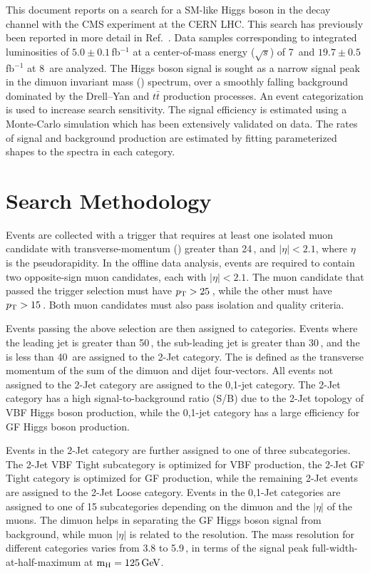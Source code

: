 \documentclass[10pt]{article}
\begin{document}
This document reports on a search for a SM-like Higgs boson in the \mm{} decay channel 
with the CMS experiment at the CERN LHC.  
This search has previously been reported in more detail in Ref.~\cite{CMS:2013aga}.
Data samples corresponding to integrated luminosities of 
$5.0\pm0.1$\,fb$^{-1}$ at a center-of-mass energy ($\sqrt{s}$) of
7\,\TeV{} and $19.7\pm0.5$\,fb$^{-1}$ at 8\,\TeV{} are analyzed.
The Higgs boson signal is sought as a narrow signal peak in the 
dimuon invariant mass (\Mmumu{}) spectrum, over a smoothly falling
background dominated by the Drell--Yan and $t\bar{t}$ production processes.  
An event categorization is used to increase search sensitivity.  
The signal efficiency is estimated using a Monte-Carlo
simulation which has been extensively validated on data.
The rates of signal and background production are estimated by fitting 
parameterized shapes to the \Mmumu{} spectra in each category.

\section{Search Methodology}

Events are collected with a trigger that requires at least one
isolated muon candidate with transverse-momentum (\pt) greater than 24\,\GeVc{},
and $|\eta|<2.1$, where $\eta$ is the pseudorapidity.  In the offline
data analysis, events are required to contain two opposite-sign
muon candidates, each with $|\eta|<2.1$.  The muon candidate that passed 
the trigger selection must have $p_{\mathrm{T}}{}>25$\,\GeVc{}, while the other must 
have $p_{\mathrm{T}}>15$\,\GeVc{}. Both muon candidates must also pass isolation and quality 
criteria.

Events passing the above selection are then assigned to categories.  Events
where the leading jet \pt{} is greater than 50\,\GeVc{}, the sub-leading
jet \pt{} is greater than 30\,\GeVc{}, and the \ptmiss{} is less than 40\,\GeVc{} 
are assigned to the 2-Jet category.  The \ptmiss{} is defined as the transverse
momentum of the sum of the dimuon and dijet four-vectors.
All events not assigned to the 2-Jet category are assigned to the 0,1-jet category.
The 2-Jet category has a high signal-to-background ratio (S/B) due to the 2-Jet
topology of VBF Higgs boson production, while the 0,1-jet category has a large
efficiency for GF Higgs boson production.

Events in the 2-Jet category are further assigned to one of three subcategories.  The 2-Jet
VBF Tight subcategory is optimized for VBF production, the 2-Jet GF Tight
category is optimized for GF production, while the remaining 2-Jet events
are assigned to the 2-Jet Loose category.  Events in the 0,1-Jet categories
are assigned to one of 15 subcategories depending on the dimuon \pt{} and the $|\eta|$
of the muons.  The dimuon \pt{} helps in separating the GF Higgs boson signal from background,
while muon $|\eta|$ is related to the \Mmumu{} resolution.  The \Mmumu{}
mass resolution for different categories varies from 3.8 to 5.9\,\GeVcc{}, 
in terms of the signal peak full-width-at-half-maximum at $\mathrm{m_H}=125\,\mathrm{Ge\kern -0.1em V}{}{}$.
\end{document}
